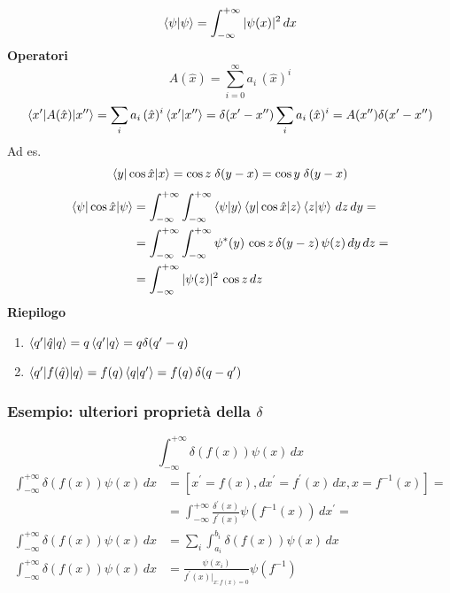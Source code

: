 \[
\braket{\psi|\psi} = \int_{-\infty}^{+\infty} |\psi(x)|^2 \, dx
\]
\textbf{Operatori}
\[
A(\hat{x}) = \sum_{i = 0}^\infty a_i \, (\hat{x})^i
\]
\[
\braket{x'|A(\hat{x})|x''} = \sum_i a_i \, (\hat{x})^i \braket{x'|x''} = \delta(x' - x'') \sum_i a_i \, (\hat{x})^i = A(x'') \delta(x' - x'')
\]
Ad es.
\[
\braket{y|\cos \hat{x}|x} = \cos z \; \delta(y - x) = \cos y \; \delta(y - x)
\]
\begin{align*}
\braket{\psi|\cos \hat{x}| \psi} &= \int_{-\infty}^{+\infty} \int_{-\infty}^{+\infty} \braket{\psi|y} \braket{y|\cos \hat{x}|z} \braket{z|\psi} \, dz \, dy = \\
&= \int_{-\infty}^{+\infty} \int_{-\infty}^{+\infty} \psi^*(y) \, \cos z \, \delta(y - z) \, \psi(z) \, dy \, dz = \\
&= \int_{-\infty}^{+\infty} |\psi(z)|^2 \, \cos z \, dz
\end{align*}
\textbf{Riepilogo}
\begin{enumerate}
\item \(\braket{q'|\hat{q}|q} = q \braket{q'|q} = q \delta(q' - q)\)
\item \(\braket{q'|f(\hat{q})|q} = f(q) \braket{q|q'} = f(q) \, \delta(q - q')\)
\end{enumerate}

\subsubsection{Esempio: ulteriori proprietà della \(\delta\)}
\[
\int_{-\infty}^{+\infty} \delta(f(x)) \psi(x) \, dx
\]
\begin{align*}
\int_{-\infty}^{+\infty} \delta(f(x)) \psi(x) \, dx &= \left[ x^\prime = f(x), dx^\prime = f^\prime(x) \, dx, x = f^{-1}(x) \right] = \\
&= \int_{-\infty}^{+\infty} \frac{\delta^\prime(x)}{f^\prime(x)} \psi(f^{-1}(x)) \, dx^\prime = \\
\int_{-\infty}^{+\infty} \delta(f(x)) \psi(x) \, dx &= \sum_i \int_{a_i}^{b_i} \delta(f(x)) \psi(x) \, dx \\ 
\int_{-\infty}^{+\infty} \delta(f(x)) \psi(x) \, dx &= \frac{\psi(x_i)}{f^\prime(x)|_{x : f(x) = 0}} \psi(f^{-1})
\end{align*}

